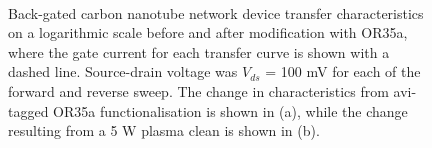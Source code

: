 \documentclass[
  a4paper,
]{scrbook}
\begin{document}
\begin{figure}
\begin{minipage}[t]{0.45\linewidth}
{{}

}

\end{minipage}%
%
\begin{minipage}[t]{0.01\linewidth}

{\centering 

~

}

\end{minipage}%

\caption[Back-gated carbon nanotube network device transfer
characteristics before and after modification with OR35a, compared to
the change resulting from a 5 W plasma
clean.]{\label{fig-OR35a-TX-comparison}Back-gated carbon nanotube
network device transfer characteristics on a logarithmic scale before
and after modification with OR35a, where the gate current for each
transfer curve is shown with a dashed line. Source-drain voltage was
\(V_{ds}\) = 100 mV for each of the forward and reverse sweep. The
change in characteristics from avi-tagged OR35a functionalisation is
shown in (a), while the change resulting from a 5 W plasma clean is
shown in (b).}

\end{figure}
\end{document}
